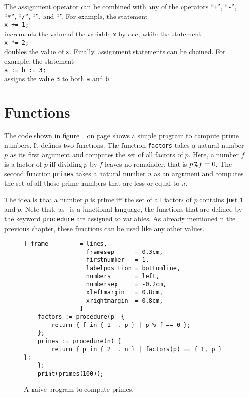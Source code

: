The assignment operator can be combined with any of the operators 
``\texttt{+}'',
``\texttt{-}'',
``\texttt{*}'',
``\texttt{/}'',
``\texttt{}'', and 
``\texttt{}''.
For example, the statement
\\[0.2cm]
\hspace*{1.3cm}
\texttt{x += 1;}
\\[0.2cm]
increments the value of the variable \texttt{x} by one,  while the statement
\\[0.2cm]
\hspace*{1.3cm}
\texttt{x *= 2;}
\\[0.2cm]
doubles the value of \texttt{x}.   Finally,
assignment statements can be chained.  For example, the statement
\\[0.2cm]
\hspace*{1.3cm}
\texttt{a := b := 3;}
\\[0.2cm]
assigns the value \texttt{3} to both  \texttt{a} and \texttt{b}.

\section{Functions}
The code shown in figure
\ref{fig:primes-slim.stlx} on page \pageref{fig:primes-slim.stlx} shows a simple program
to compute prime numbers.  It defines two functions.  The function \texttt{factors} takes a
natural number $p$ as its first argument and computes the set of all factors of $p$.  Here, a number
$f$ is a factor of $p$ iff dividing $p$ by $f$ leaves no remainder, that is 
$p \,\texttt{\symbol{37}}\, f = 0$.
The second function \texttt{primes} takes a natural number $n$ as an argument and computes the
set of all those prime numbers that are less or equal to $n$.  

The idea is that a number $p$ is prime
iff the set of all  factors of $p$ contains just $1$ and $p$.  
Note that, as \setlx\ is a functional language, the functions that are defined by the
keyword \texttt{procedure}  are assigned to variables.  As already
mentioned n the previous chapter, these functions can be used like
any other values.


\begin{figure}[!ht]
\centering
\begin{Verbatim}[ frame         = lines, 
                  framesep      = 0.3cm, 
                  firstnumber   = 1,
                  labelposition = bottomline,
                  numbers       = left,
                  numbersep     = -0.2cm,
                  xleftmargin   = 0.8cm,
                  xrightmargin  = 0.8cm,
                ]
    factors := procedure(p) {
        return { f in { 1 .. p } | p % f == 0 };
    };
    primes := procedure(n) {
        return { p in { 2 .. n } | factors(p) == { 1, p } };
    };
    print(primes(100));
\end{Verbatim}
\vspace*{-0.3cm}
\caption{A naive program to compute primes.}
\label{fig:primes-slim.stlx}
\end{figure}

